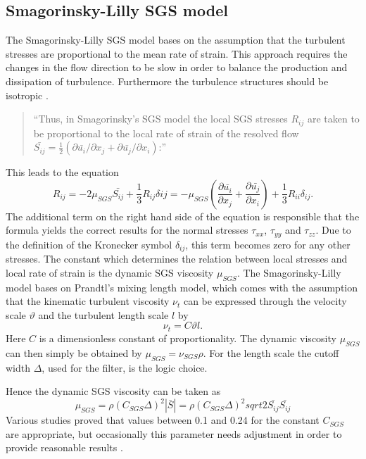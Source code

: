 \subsection{Smagorinsky-Lilly SGS model}
The Smagorinsky-Lilly SGS model bases on the assumption that the turbulent stresses are proportional to the mean rate of strain. This approach requires the changes in the flow direction to be slow in order to balance the production and dissipation of turbulence. Furthermore the turbulence structures should be isotropic \cite{versteeg}.
\begin{quote}
``Thus, in Smagorinsky's SGS model the local SGS stresses $R_{ij}$ are taken to be proportional to the local rate of strain of the resolved flow $\bar{S_{ij}} = \frac{1}{2}(\partial \bar{u_i}/\partial x_j + \partial \bar{u_j}/\partial x_i)$:'' \cite[p.102]{versteeg}
\end{quote}
This leads to the equation
\begin{equation}
R_{ij} = -2 \mu_{SGS} \bar{S_{ij}} + \frac{1}{3} R_{ij} \delta{ij} = -\mu_{SGS} \left( \frac{\partial \bar{u_i}}{\partial x_j} + \frac{\partial \bar{u_j}}{\partial x_i} \right) + \frac{1}{3} R_{ii} \delta_{ij}.
\end{equation}
The additional term on the right hand side of the equation is responsible that the formula yields the correct results for the normal stresses $\tau_{xx}$, $\tau_{yy}$ and $\tau_{zz}$. Due to the definition of the Kronecker symbol $\delta_{ij}$, this term becomes zero for any other stresses. The constant which determines the relation between local stresses and local rate of strain is the dynamic SGS viscosity $\mu_{SGS}$.
The Smagorinsky-Lilly model bases on Prandtl's mixing length model, which comes with the assumption that the kinematic turbulent viscosity $\nu_t$ can be expressed through the velocity scale $\vartheta$ and the turbulent length scale $l$ by
\begin{equation}
\nu_t = C \vartheta l .
\end{equation}
Here $C$ is a dimensionless constant of proportionality. The dynamic viscosity $\mu_{SGS}$ can then simply be obtained by $\mu_{SGS} = \nu_{SGS} \rho$. For the length scale the cutoff width $\Delta$, used for the filter, is the logic choice.

Hence the dynamic SGS viscosity can be taken as
\begin{equation}
\mu_{SGS} = \rho (C_{SGS} \Delta)^2 |\bar{S}| = \rho(C_{SGS} \Delta)^2 sqrt{2 \bar{S_{ij}} \bar{S_{ij}}}
\end{equation}
Various studies proved that values between 0.1 and 0.24 for the constant $C_{SGS}$ are appropriate, but occasionally this parameter needs adjustment in order to provide reasonable results \cite{versteeg}.
